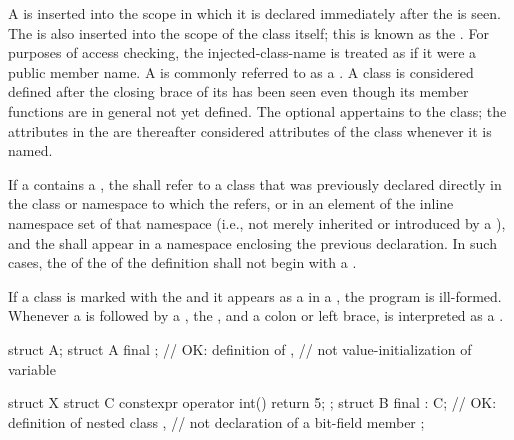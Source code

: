 \pnum
A  is inserted into the scope in which it is
declared immediately after the  is seen. The
 is also inserted into the scope of the class
itself; this is known as the .
For purposes of access checking, the injected-class-name is treated as
if it were a public member name.
A  is commonly referred to as a .
A class is considered defined after the closing brace of its
 has been seen even though its member
functions are in general not yet defined.
The optional  appertains to the class; the attributes in
the  are thereafter considered attributes of the class
whenever it is named.

\pnum
If a  contains a ,
the  shall refer to a class that was
previously declared directly in the class or namespace to which the
 refers,
or in an element of the inline namespace set of that namespace
(i.e., not merely inherited or
introduced by a ), and the
 shall appear in a namespace enclosing the
previous declaration.
In such cases, the  of the
 of the
definition shall not begin with a .

\pnum
If a class is marked with the   and it appears
as a  in a ,
the program is ill-formed. Whenever a
 is followed by a , the
 , and a colon or left brace,  is
interpreted as a . \begin{example}
\begin{codeblock}
struct A;
struct A final {};      // OK: definition of ,
                        // not value-initialization of variable 

struct X {
 struct C { constexpr operator int() { return 5; } };
 struct B final : C{};  // OK: definition of nested class ,
                        // not declaration of a bit-field member 
};
\end{codeblock}
\end{example}

